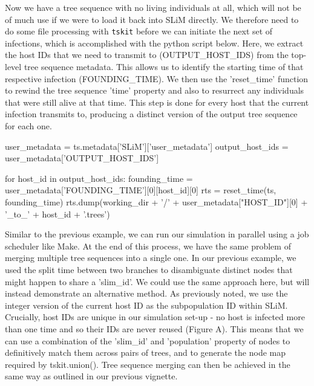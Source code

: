 \documentclass[12pt]{article}
\newcommand{\tskit}[0]{\texttt{tskit}\xspace}
\begin{document}
Now we have a tree sequence with no living individuals at all, which will not be of much use if we were to load it back into SLiM directly. We therefore need to do some file processing
with \tskit before we can initiate the next set of infections, which is accomplished with the python script below. Here, we extract the host IDs that we need to transmit to (OUTPUT\_HOST\_IDS)
from the top-level tree sequence metadata. This allows us to identify the starting time of that respective infection (FOUNDING\_TIME). We then use the 'reset_time' function to rewind
the tree sequence 'time' property and also to resurrect any individuals that were still alive at that time. This step is done for every host that the current infection transmits to, producing
a distinct version of the output tree sequence for each one.

    user_metadata = ts.metadata['SLiM']['user_metadata']
    output_host_ids = user_metadata['OUTPUT_HOST_IDS']

    for host_id in output_host_ids:
        founding_time = user_metadata['FOUNDING_TIME'][0][host_id][0]
        rts = reset_time(ts, founding_time)
        rts.dump(working_dir + '/' + user_metadata["HOST_ID"][0] + '_to_' + host_id + '.trees')

Similar to the previous example, we can run our simulation in parallel using a job scheduler like Make. %
At the end of this process, we have the same problem of merging multiple tree sequences into a single one. In our previous example, we used the split time between two branches
to disambiguate distinct nodes that might happen to share a 'slim\_id'. We could use the same approach here, but will instead demonstrate an alternative method. As previously
noted, we use the integer version of the current host ID as the subpopulation ID within SLiM. Crucially, host IDs are unique in our simulation set-up - no host is infected more than
one time and so their IDs are never reused  (Figure A). This means that we can use a combination of the 'slim\_id' and 'population' property of nodes to
definitively match them across pairs of trees, and to generate the node map required by tskit.union(). Tree sequence merging can then be achieved in the same way as outlined
in our previous vignette. %
\end{document}
